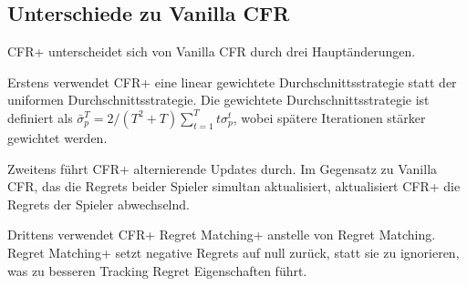 \subsection{Unterschiede zu Vanilla CFR}

CFR+ unterscheidet sich von Vanilla CFR durch drei Hauptänderungen.

Erstens verwendet CFR+ eine linear gewichtete Durchschnittsstrategie statt der uniformen Durchschnittsstrategie.
Die gewichtete Durchschnittsstrategie ist definiert als $\bar{\sigma}_p^T = 2/(T^2 + T) \sum_{t=1}^T t\sigma_p^t$, wobei spätere Iterationen stärker gewichtet werden.

Zweitens führt CFR+ alternierende Updates durch.
Im Gegensatz zu Vanilla CFR, das die Regrets beider Spieler simultan aktualisiert, aktualisiert CFR+ die Regrets der Spieler abwechselnd.

Drittens verwendet CFR+ Regret Matching+ anstelle von Regret Matching.
Regret Matching+ setzt negative Regrets auf null zurück, statt sie zu ignorieren, was zu besseren Tracking Regret Eigenschaften führt.
